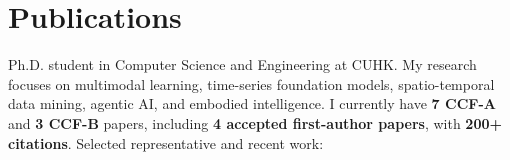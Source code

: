 \vspace{-4mm}
\section{Publications}


Ph.D. student in Computer Science and Engineering at CUHK. My research focuses on multimodal learning, time-series foundation models, spatio-temporal data mining, agentic AI, and embodied intelligence. I currently have \textbf{7 CCF-A} and \textbf{3 CCF-B} papers, including \textbf{4 accepted first-author papers}, with \textbf{200+ citations}. Selected representative and recent work:
